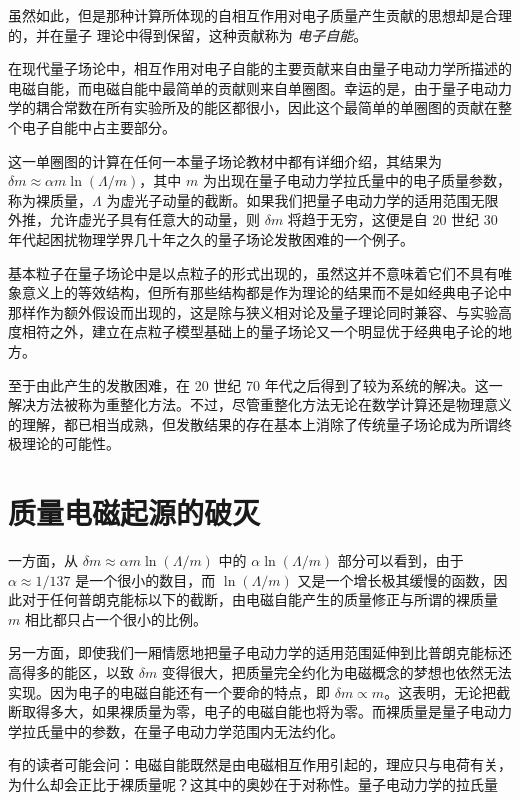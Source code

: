 \documentclass[oneside,a4paper,openany,11pt]{ctexbook}
\begin{document}
虽然如此，但是那种计算所体现的自相互作用对电子质量产生贡献的思想却是合理的，并在量子
理论中得到保留，这种贡献称为 \emph{电子自能}。

在现代量子场论中，相互作用对电子自能的主要贡献来自由量子电动力学所描述的电磁自能，而电磁自能中最简单的贡献则来自单圈图。幸运的是，由于量子电动力学的耦合常数在所有实验所及的能区都很小，因此这个最简单的单圈图的贡献在整个电子自能中占主要部分。

这一单圈图的计算在任何一本量子场论教材中都有详细介绍，其结果为 $\delta m \approx \alpha m \ln(\Lambda/m)$，其中 $m$ 为出现在量子电动力学拉氏量中的电子质量参数，称为裸质量，$\Lambda$ 为虚光子动量的截断。如果我们把量子电动力学的适用范围无限外推，允许虚光子具有任意大的动量，则 $\delta m$ 将趋于无穷，这便是自 20 世纪 30 年代起困扰物理学界几十年之久的量子场论发散困难的一个例子。

基本粒子在量子场论中是以点粒子的形式出现的，虽然这并不意味着它们不具有唯象意义上的等效结构，但所有那些结构都是作为理论的结果而不是如经典电子论中那样作为额外假设而出现的，这是除与狭义相对论及量子理论同时兼容、与实验高度相符之外，建立在点粒子模型基础上的量子场论又一个明显优于经典电子论的地方。

至于由此产生的发散困难，在 20 世纪 70 年代之后得到了较为系统的解决。这一解决方法被称为重整化方法。不过，尽管重整化方法无论在数学计算还是物理意义的理解，都已相当成熟，但发散结果的存在基本上消除了传统量子场论成为所谓终极理论的可能性。

\section{质量电磁起源的破灭}

一方面，从 $\delta m\approx \alpha m \ln(\Lambda/m)$ 中的 $\alpha \ln(\Lambda/m)$ 部分可以看到，由于 $\alpha\approx 1/137$ 是一个很小的数目，而 $\ln(\Lambda/m)$ 又是一个增长极其缓慢的函数，因此对于任何普朗克能标以下的截断，由电磁自能产生的质量修正与所谓的裸质量 $m$ 相比都只占一个很小的比例。

另一方面，即使我们一厢情愿地把量子电动力学的适用范围延伸到比普朗克能标还高得多的能区，以致 $\delta m$ 变得很大，把质量完全约化为电磁概念的梦想也依然无法实现。因为电子的电磁自能还有一个要命的特点，即 $\delta m \propto m$。这表明，无论把截断取得多大，如果裸质量为零，电子的电磁自能也将为零。而裸质量是量子电动力学拉氏量中的参数，在量子电动力学范围内无法约化。

有的读者可能会问：电磁自能既然是由电磁相互作用引起的，理应只与电荷有关，为什么却会正比于裸质量呢？这其中的奥妙在于对称性。量子电动力学的拉氏量
\end{document}
